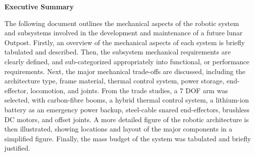 
\vspace*{\fill}
\begin{center}
\large
\textbf{Executive Summary}
\end{center}

\normalsize
The following document outlines the mechanical aspects of the robotic system and subsystems involved in the development and maintenance of a future lunar Outpost. Firstly, an overview of the mechanical aspects of each system is briefly tabulated and described. Then, the subsystem mechanical requirements are clearly defined, and sub-categorized appropriately into functional, or performance requirements. Next, the major mechanical trade-offs are discussed, including the architecture type, frame material, thermal control system, power storage, end-effector, locomotion, and joints. From the trade studies, a 7 DOF arm was selected, with carbon-fibre booms, a hybrid thermal control system, a lithium-ion battery as an emergency power backup, steel-cable snared end-effectors, brushless DC motors, and offset joints. A more detailed figure of the robotic architecture is then illustrated, showing locations and layout of the major components in a simplified figure. Finally, the mass budget of the system was tabulated and briefly justified.

\vspace*{\fill}

